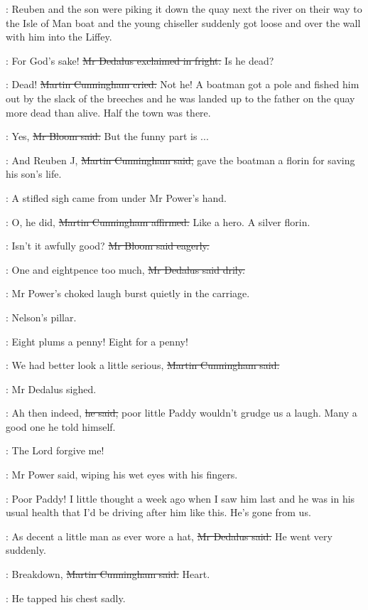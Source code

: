 \cunningham:
Reuben and the son were piking it down the quay next the river
on their way to the Isle of Man boat
and the young chiseller suddenly got loose
and over the wall with him
into the Liffey.

\simon:
For God's sake!
\sout{Mr Dedalus exclaimed in fright.}
Is he dead?

\cunningham:
Dead!
\sout{Martin Cunningham cried.}
Not he!
A boatman got a pole and fished him out by the slack of the breeches
and he was landed up to the father on the quay
more dead than alive.
Half the town was there.

\Bloom:
Yes,
\sout{Mr Bloom said.}
But the funny part is ...

\cunningham:
And Reuben J,
\sout{Martin Cunningham said,}
gave the boatman a florin for saving his son's life.

:
A stifled sigh came from under Mr Power's hand.

\cunningham:
O, he did,
\sout{Martin Cunningham affirmed.}
Like a hero.
A silver florin.

\Bloom:
Isn't it awfully good?
\sout{Mr Bloom said eagerly.}

\simon:
One and eightpence too much,
\sout{Mr Dedalus said drily.}

:
Mr Power's choked laugh burst quietly in the carriage.

\BloomInt:
Nelson's pillar.

\woman:
Eight plums a penny!
Eight for a penny!

\cunningham:
We had better look a little serious,
\sout{Martin Cunningham said.}

:
Mr Dedalus sighed.

\simon:
Ah then indeed,
\sout{he said,}
poor little Paddy wouldn't grudge us a laugh.
Many a good one he told himself.

\power:
The Lord forgive me!

:
Mr Power said,
wiping his wet eyes with his fingers.

\power:
Poor Paddy!
I little thought a week ago
when I saw him last
and he was in his usual health
that I'd be driving after him like this.
He's gone from us.

\simon:
As decent a little man as ever wore a hat,
\sout{Mr Dedalus said.}
He went very suddenly.

\cunningham:
Breakdown,
\sout{Martin Cunningham said.}
Heart.

:
He tapped his chest sadly.

